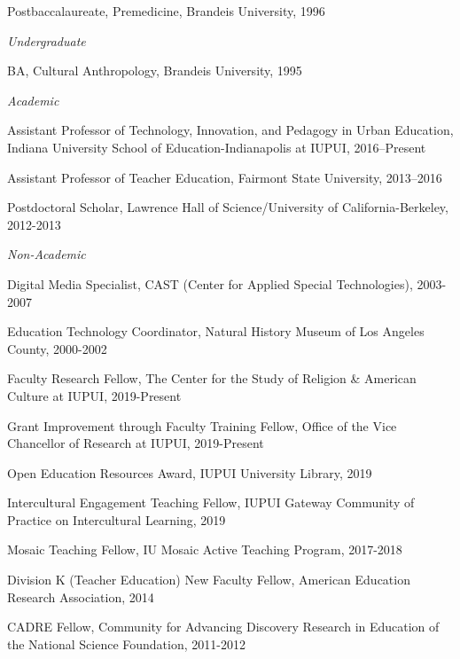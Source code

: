 \documentclass[11pt,article,oneside]{memoir}
\begin{document}
\ind Postbaccalaureate, Premedicine, Brandeis University, 1996

\bigskip

\noindent\emph{Undergraduate \vspace{0.01in}}

\ind BA, Cultural Anthropology, Brandeis University, 1995

 \bigskip

\medskip
\noindent\emph{Academic \vspace{0.01in}}

\ind Assistant Professor of Technology, Innovation, and Pedagogy in Urban Education,  Indiana University School of Education-Indianapolis at IUPUI, 2016--Present

\ind Assistant Professor of Teacher Education, Fairmont State University, 2013--2016

\ind Postdoctoral Scholar, Lawrence Hall of Science/University of California-Berkeley, 2012-2013

\bigskip

\noindent\emph{Non-Academic \vspace{0.01in}}

\ind Digital Media Specialist, CAST (Center for Applied Special Technologies), 2003-2007

\ind Education Technology Coordinator, Natural History Museum of Los Angeles County, 2000-2002

\bigskip

\medskip

\ind Faculty Research Fellow, The Center for the Study of Religion \& American Culture at IUPUI, 2019-Present

\ind Grant Improvement through Faculty Training Fellow, Office of the Vice Chancellor of Research at IUPUI, 2019-Present

\ind Open Education Resources Award, IUPUI University Library, 2019

\ind Intercultural Engagement Teaching Fellow, IUPUI Gateway Community of Practice on Intercultural Learning, 2019

\ind Mosaic Teaching Fellow, IU Mosaic Active Teaching Program, 2017-2018

\ind Division K (Teacher Education) New Faculty Fellow, American Education Research Association, 2014

\ind CADRE Fellow, Community for Advancing Discovery Research in Education of the National Science Foundation, 2011-2012
\end{document}
